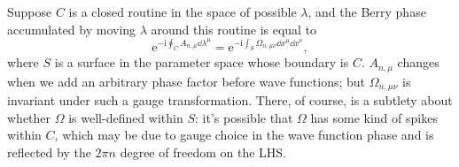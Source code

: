 \documentclass[hyperref, a4paper]{article}
\newcommand*{\ii}{\mathrm{i}}
\newcommand*{\ee}{\mathrm{e}}
\begin{document}
Suppose $C$ is a closed routine in the space of possible $\lambda$, 
and the Berry phase accumulated 
by moving $\lambda$ around this routine is equal to 
\begin{equation}
    \ee^{- \ii \oint_C A_{n, \mu} \dd{\lambda^\mu}}
    = \ee^{- \ii \int_S \Omega_{n, \mu \nu} \dd{x^\mu} \dd{x^\nu}},
\end{equation}
where $S$ is a surface in the parameter space whose boundary is $C$.
$A_{n, \mu}$ changes when we add an arbitrary phase factor before wave functions; 
but $\Omega_{n, \mu \nu}$ is invariant under such a gauge transformation.
There, of course, is a subtlety about whether $\Omega$ is well-defined within $S$:
it's possible that $\Omega$ has some kind of spikes within $C$,
which may be due to gauge choice in the wave function phase 
and is reflected by the $2\pi n$ degree of freedom on the LHS.
\end{document}
